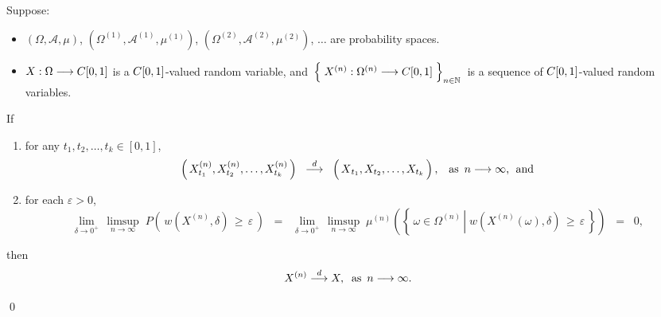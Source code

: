 \begin{theorem}
\mbox{}\vskip 0.1cm
\noindent
Suppose:
\begin{itemize}
\item	$\left(\Omega,\mathcal{A},\mu\right)$,
		$\left(\Omega^{(1)},\mathcal{A}^{(1)},\mu^{(1)}\right)$,
		$\left(\Omega^{(2)},\mathcal{A}^{(2)},\mu^{(2)}\right)$,
		$\dots$\;
		are probability spaces.
\item	$X : \Omega \longrightarrow C[0,1]$ is a $C[0,1]$-valued random variable, and
		\,$\left\{\;X^{(n)} : \Omega^{(n)} \overset{{\color{white}1}}{\longrightarrow} \Czo\;\right\}_{n\in\N}$\,
		is a sequence of $C[0,1]$-valued random variables.
\end{itemize}
If
\begin{enumerate}
\item	for any $t_{1}, t_{2}, \ldots, t_{k} \in [0,1]$,
		\begin{equation*}
		\left(\,X^{(n)}_{t_{1}},X^{(n)}_{t_{2}},\ldots,X^{(n)}_{t_{k}}\,\right)
		\;\; \overset{d}{\longrightarrow} \;\;
		\left(\,\overset{{\color{white}.}}{X}_{t_{1}},X_{t_{2}},\ldots,X_{t_{k}}\,\right),
		\;\;\;\textnormal{as \,$n \longrightarrow \infty$,\; and}
		\end{equation*}
\item	for each $\varepsilon > 0$,
		\begin{equation*}
			\underset{\delta\rightarrow 0^{+}}{\lim}\,
			\underset{n\rightarrow\infty}{\limsup}\;
			P\!\left(\, w(X^{(n)},\delta) \,\geq\, \varepsilon \,\right)
		\;\; = \;\;
			\underset{\delta\rightarrow 0^{+}}{\lim}\,
			\underset{n\rightarrow\infty}{\limsup}\;
			\mu^{(n)}\!\left(\left\{\,
				\omega \in \Omega^{(n)}
				\,\left\vert\;
					w(X^{(n)}(\omega),\delta) \,\geq\, \varepsilon
				\right.
			\,\right\}\right)
		\;\; = \;\;
			0,
		\end{equation*}
\end{enumerate}
then
\begin{equation*}
X^{(n)} \overset{d}{\longrightarrow} X,
\;\;\textnormal{as \,$n \longrightarrow \infty$}.
\end{equation*}
\end{theorem}
\proof
\qed
